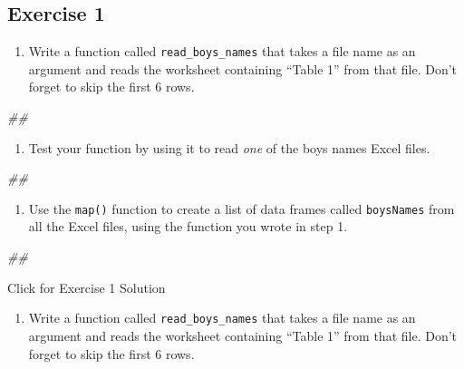 \documentclass[
]{book}
\newenvironment{Shaded}{\begin{snugshade}}{\end{snugshade}}
\newcommand{\CommentTok}[1]{\textcolor[rgb]{0.56,0.35,0.01}{\textit{#1}}}
\providecommand{\tightlist}{%
  \setlength{\itemsep}{0pt}\setlength{\parskip}{0pt}}
\begin{document}
\hypertarget{exercise-1-3}{%
\subsection{Exercise 1}\label{exercise-1-3}}

\begin{enumerate}
\def\labelenumi{\arabic{enumi}.}
\tightlist
\item
  Write a function called \texttt{read\_boys\_names} that takes a file name as an argument and reads the worksheet containing ``Table 1'' from that file. Don't forget to skip the first 6 rows.
\end{enumerate}

\begin{Shaded}
\begin{Highlighting}[]
\CommentTok{\#\# }
\end{Highlighting}
\end{Shaded}

\begin{enumerate}
\def\labelenumi{\arabic{enumi}.}
\setcounter{enumi}{1}
\tightlist
\item
  Test your function by using it to read \emph{one} of the boys names Excel files.
\end{enumerate}

\begin{Shaded}
\begin{Highlighting}[]
\CommentTok{\#\# }
\end{Highlighting}
\end{Shaded}

\begin{enumerate}
\def\labelenumi{\arabic{enumi}.}
\setcounter{enumi}{2}
\tightlist
\item
  Use the \texttt{map()} function to create a list of data frames called \texttt{boysNames} from all the Excel files, using the function you wrote in step 1.
\end{enumerate}

\begin{Shaded}
\begin{Highlighting}[]
\CommentTok{\#\# }
\end{Highlighting}
\end{Shaded}

{Click for Exercise 1 Solution}

\begin{enumerate}
\def\labelenumi{\arabic{enumi}.}
\tightlist
\item
  Write a function called \texttt{read\_boys\_names} that takes a file name as an argument and reads the worksheet containing ``Table 1'' from that file. Don't forget to skip the first 6 rows.
\end{enumerate}
\end{document}
